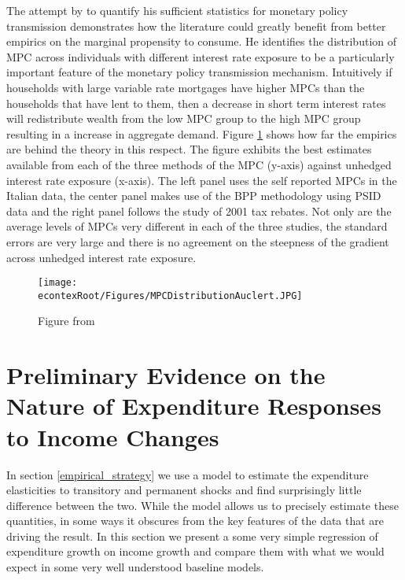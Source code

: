 \documentclass[titlepage]{\econtex}\newcommand{\texname}{IncomeUncertainty}
\begin{document}
The attempt by \cite{auclert_monetary_2015} to quantify his sufficient statistics for monetary policy transmission demonstrates how the literature could greatly benefit from better empirics on the marginal propensity to consume. He identifies the distribution of MPC across individuals with different interest rate exposure to be a particularly important feature of the monetary policy transmission mechanism. Intuitively if households with large variable rate mortgages have higher MPCs than the households that have lent to them, then a decrease in short term interest rates will redistribute wealth from the low MPC group to the high MPC group resulting in a increase in aggregate demand. Figure \ref{fig:Auclert} shows how far the empirics are behind the theory in this respect. The figure exhibits the best estimates available from each of the three methods of the MPC (y-axis) against unhedged interest rate exposure (x-axis). The left panel uses the self reported MPCs in the Italian data, the center panel makes use of the BPP methodology using PSID data and the right panel follows the \cite{johnson_household_2006} study of 2001 tax rebates. Not only are the average levels of MPCs very different in each of the three studies, the standard errors are very large and there is no agreement on the steepness of the gradient across unhedged interest rate exposure.
	\begin{figure} 
	\begin{centering}
	\texttt{[image: \\econtexRoot/Figures/MPCDistributionAuclert.JPG]}
	\caption{Figure from \cite{auclert_monetary_2015}}
	\label{fig:Auclert}
	\end{centering}
	\end{figure}
	
\section{Preliminary Evidence on the Nature of Expenditure Responses to Income Changes}
In section \ref{empirical_strategy} we use a model to estimate the expenditure elasticities to transitory and permanent shocks and find surprisingly little difference between the two. While the model allows us to precisely estimate these quantities, in some ways it obscures from the key features of the data that are driving the result. In this section we present a some very simple regression of expenditure growth on income growth and compare them with what we would expect in some very well understood baseline models.
\end{document}
